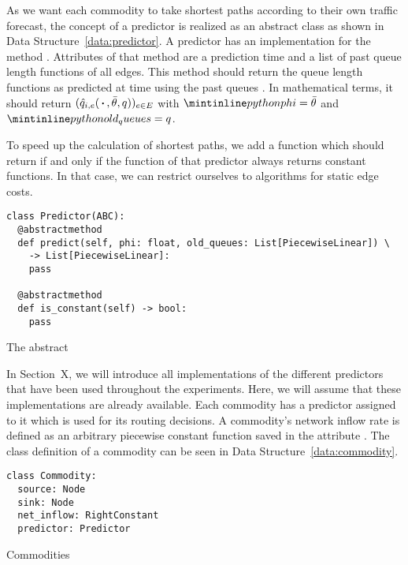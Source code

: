 As we want each commodity to take shortest paths according to their own traffic forecast, the concept of a predictor is realized as an abstract class as shown in Data Structure~\ref{data:predictor}.
A predictor has an implementation for the method . Attributes of that method are a prediction time  and a list  of past queue length functions of all edges.
This method should return the queue length functions as predicted at time  using the past queues .
In mathematical terms, it should return $(\hat q_{i,e}(\,\boldsymbol{\cdot}\,, \bar\theta, q))_{e\in E}$ with $\code{phi}= \bar\theta$ and $\code{old_queues} = q$.

To speed up the calculation of shortest paths, we add a function  which should return  if and only if the  function of that predictor always returns constant functions.
In that case, we can restrict ourselves to algorithms for static edge costs.

\begin{classdef}
  \begin{verbatim}
class Predictor(ABC):
  @abstractmethod
  def predict(self, phi: float, old_queues: List[PiecewiseLinear]) \
    -> List[PiecewiseLinear]:
    pass
  
  @abstractmethod
  def is_constant(self) -> bool:
    pass
\end{verbatim}
\caption{The abstract }
\label{data:predictor}
\end{classdef}


In Section~X, we will introduce all implementations of the different predictors that have been used throughout the experiments.
Here, we will assume that these implementations are already available.
Each commodity has a predictor assigned to it which is used for its routing decisions.
A commodity's network inflow rate is defined as an arbitrary piecewise constant function saved in the attribute . 
The class definition of a commodity can be seen in Data Structure~\ref{data:commodity}.

\begin{classdef}
    \begin{verbatim}
class Commodity:
  source: Node
  sink: Node
  net_inflow: RightConstant
  predictor: Predictor
\end{verbatim}
\caption{Commodities}%
\label{data:commodity}
\end{classdef}

